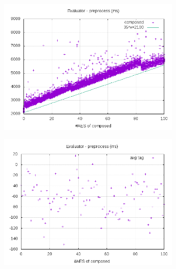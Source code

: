 \documentclass[10pt,a4paper]{article}
\begin{document}
\begin{figure}[h]
    \begin{subfigure}[t]{0.3\textwidth}
        \includegraphics[width=\textwidth]{eval_preprocess_plots}
        \caption{}
        \label{data eval preprocess composed}
    \end{subfigure}
    \begin{subfigure}[t]{0.3\textwidth}
        \includegraphics[width=\textwidth]{eval_preprocess_avg}
        \caption{}
        \label{data eval preprocess avg}
    \end{subfigure}
    \begin{subfigure}[t]{0.3\textwidth}

\end{subfigure}
\end{figure}
\end{document}
